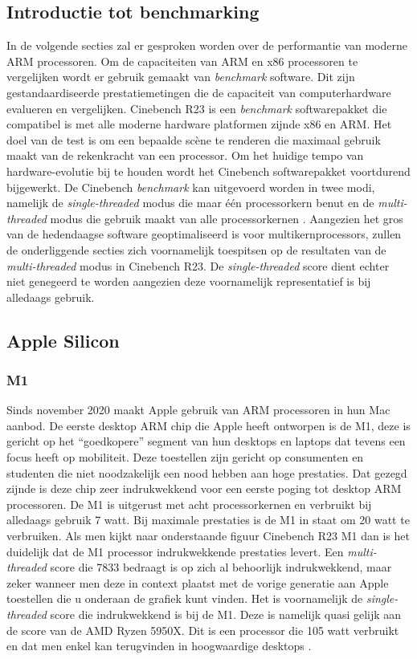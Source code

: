 \subsection{Introductie tot benchmarking}
In de volgende secties zal er gesproken worden over de performantie van moderne ARM processoren. Om de capaciteiten van ARM en x86 processoren te vergelijken wordt er gebruik gemaakt van \textit{benchmark} software. Dit zijn gestandaardiseerde prestatiemetingen die de capaciteit van computerhardware evalueren en vergelijken. Cinebench R23 is een \textit{benchmark} softwarepakket die compatibel is met alle moderne hardware platformen zijnde x86 en ARM. Het doel van de test is om een bepaalde scène te renderen die maximaal gebruik maakt van de rekenkracht van een processor. Om het huidige tempo van hardware-evolutie bij te houden wordt het Cinebench softwarepakket voortdurend bijgewerkt. De Cinebench \textit{benchmark} kan uitgevoerd worden in twee modi, namelijk de \textit{single-threaded} modus die maar één processorkern benut en de \textit{multi-threaded} modus die gebruik maakt van alle processorkernen \autocite{Maxon2022}. Aangezien het gros van de hedendaagse software geoptimaliseerd is voor multikernprocessors, zullen de onderliggende secties zich voornamelijk toespitsen op de resultaten van de \textit{multi-threaded} modus in Cinebench R23. De \textit{single-threaded} score dient echter niet genegeerd te worden aangezien deze voornamelijk representatief is bij alledaags gebruik.

\subsection{Apple Silicon}
\subsubsection{M1}
Sinds november 2020 maakt Apple gebruik van ARM processoren in hun Mac aanbod. De eerste desktop ARM chip die Apple heeft ontworpen is de M1, deze is gericht op het “goedkopere” segment van hun desktops en laptops dat tevens een focus heeft op mobiliteit. Deze toestellen zijn gericht op consumenten en studenten die niet noodzakelijk een nood hebben aan hoge prestaties. Dat gezegd zijnde is deze chip zeer indrukwekkend voor een eerste poging tot desktop ARM processoren. De M1 is uitgerust met acht processorkernen en verbruikt bij alledaags gebruik 7 watt. Bij maximale prestaties is de M1 in staat om 20 watt te verbruiken. Als men kijkt naar onderstaande figuur Cinebench R23 M1 dan is het duidelijk dat de M1 processor indrukwekkende prestaties levert. Een \textit{multi-threaded} score die 7833 bedraagt is op zich al behoorlijk indrukwekkend, maar zeker wanneer men deze in context plaatst met de vorige generatie aan Apple toestellen die u onderaan de grafiek kunt vinden. Het is voornamelijk de \textit{single-threaded} score die indrukwekkend is bij de M1. Deze is namelijk quasi gelijk aan de score van de AMD Ryzen 5950X. Dit is een processor die 105 watt verbruikt en dat men enkel kan terugvinden in hoogwaardige desktops \autocite{Frumusanu2020a}.

